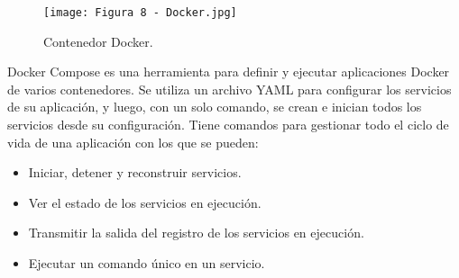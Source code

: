 \begin{figure}[h]
\centering
\texttt{[image: Figura 8 - Docker.jpg]}
\caption[Docker]{Contenedor Docker. \footnotemark}
\label{fig:9}
\end{figure}

Docker Compose es una herramienta para definir y ejecutar aplicaciones Docker de varios contenedores. Se utiliza un archivo YAML para configurar los servicios de su aplicación, y luego, con un solo comando, se crean e inician todos los servicios desde su configuración. Tiene comandos para gestionar todo el ciclo de vida de una aplicación con los que se pueden\citep{21}:

\begin{itemize}
	\item Iniciar, detener y reconstruir servicios.
	\item Ver el estado de los servicios en ejecución.
	\item Transmitir la salida del registro de los servicios en ejecución.
	\item Ejecutar un comando único en un servicio.
\end{itemize}
